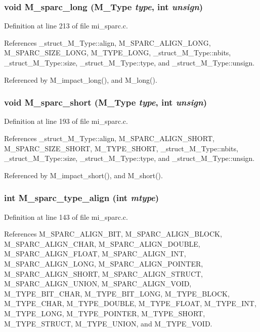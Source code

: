 \subsubsection{\setlength{\rightskip}{0pt plus 5cm}void M\_\-sparc\_\-long (\bf{M\_\-Type} {\em type}, int {\em unsign})}\label{mi__sparc_8c_e445333b13e05cf42cea88777d9ca0ae}




Definition at line 213 of file mi\_\-sparc.c.

References \_\-struct\_\-M\_\-Type::align, M\_\-SPARC\_\-ALIGN\_\-LONG, M\_\-SPARC\_\-SIZE\_\-LONG, M\_\-TYPE\_\-LONG, \_\-struct\_\-M\_\-Type::nbits, \_\-struct\_\-M\_\-Type::size, \_\-struct\_\-M\_\-Type::type, and \_\-struct\_\-M\_\-Type::unsign.

Referenced by M\_\-impact\_\-long(), and M\_\-long().
\subsubsection{\setlength{\rightskip}{0pt plus 5cm}void M\_\-sparc\_\-short (\bf{M\_\-Type} {\em type}, int {\em unsign})}\label{mi__sparc_8c_a546df12ac7074d2ad2c38f89eab877a}




Definition at line 193 of file mi\_\-sparc.c.

References \_\-struct\_\-M\_\-Type::align, M\_\-SPARC\_\-ALIGN\_\-SHORT, M\_\-SPARC\_\-SIZE\_\-SHORT, M\_\-TYPE\_\-SHORT, \_\-struct\_\-M\_\-Type::nbits, \_\-struct\_\-M\_\-Type::size, \_\-struct\_\-M\_\-Type::type, and \_\-struct\_\-M\_\-Type::unsign.

Referenced by M\_\-impact\_\-short(), and M\_\-short().
\subsubsection{\setlength{\rightskip}{0pt plus 5cm}int M\_\-sparc\_\-type\_\-align (int {\em mtype})}\label{mi__sparc_8c_da02595d4004914b605403aaec629d14}




Definition at line 143 of file mi\_\-sparc.c.

References M\_\-SPARC\_\-ALIGN\_\-BIT, M\_\-SPARC\_\-ALIGN\_\-BLOCK, M\_\-SPARC\_\-ALIGN\_\-CHAR, M\_\-SPARC\_\-ALIGN\_\-DOUBLE, M\_\-SPARC\_\-ALIGN\_\-FLOAT, M\_\-SPARC\_\-ALIGN\_\-INT, M\_\-SPARC\_\-ALIGN\_\-LONG, M\_\-SPARC\_\-ALIGN\_\-POINTER, M\_\-SPARC\_\-ALIGN\_\-SHORT, M\_\-SPARC\_\-ALIGN\_\-STRUCT, M\_\-SPARC\_\-ALIGN\_\-UNION, M\_\-SPARC\_\-ALIGN\_\-VOID, M\_\-TYPE\_\-BIT\_\-CHAR, M\_\-TYPE\_\-BIT\_\-LONG, M\_\-TYPE\_\-BLOCK, M\_\-TYPE\_\-CHAR, M\_\-TYPE\_\-DOUBLE, M\_\-TYPE\_\-FLOAT, M\_\-TYPE\_\-INT, M\_\-TYPE\_\-LONG, M\_\-TYPE\_\-POINTER, M\_\-TYPE\_\-SHORT, M\_\-TYPE\_\-STRUCT, M\_\-TYPE\_\-UNION, and M\_\-TYPE\_\-VOID.

